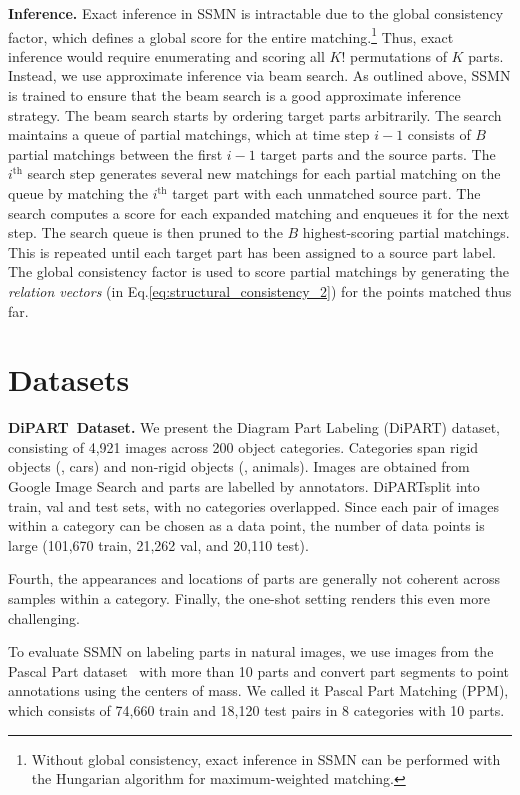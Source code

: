 \documentclass[10pt,twocolumn,letterpaper]{article}
\newcommand{\dataset}{\mbox{DiPART}}
\begin{document}
\vspace{.5em}\noindent\textbf{Inference.}
Exact inference in SSMN is intractable due to the global consistency factor, which defines a global score for the entire matching.\footnote{Without global consistency, exact inference in SSMN can be performed with the Hungarian algorithm for maximum-weighted matching.} Thus, exact inference would require enumerating and scoring all $K!$ permutations of $K$ parts. Instead, we use approximate inference via beam search. As outlined above, SSMN is trained to ensure that the beam search is a good approximate inference strategy. The beam search starts by ordering target parts arbitrarily. The search maintains a queue of partial matchings, which at time step $i - 1$ consists of $B$ partial matchings between the first $i-1$ target parts and the source parts. The $i^\text{th}$ search step generates several new matchings for each partial matching on the queue by matching the $i^\text{th}$ target part with each unmatched source part. The search computes a score for each expanded matching and enqueues it for the next step. The search queue is then pruned to the $B$ highest-scoring partial matchings. This is repeated until each target part has been assigned to a source part label. The global consistency factor is used to score partial matchings by generating the \emph{relation vectors} (in Eq.\ref{eq:structural_consistency_2}) for the points matched thus far.


\section{Datasets}
\label{sec:dataset}
\noindent\textbf{\dataset\ Dataset.}
We present the Diagram Part Labeling (\dataset) dataset, consisting of 4,921 images across 200 object categories. Categories span rigid objects (\eg, cars) and non-rigid objects (\eg, animals). Images are obtained from Google Image Search and parts are labelled by annotators. \dataset\is split into train, val and test sets, with no categories overlapped. Since each pair of images within a category can be chosen as a data point, the number of data points is large (101,670 train, 21,262 val, and 20,110 test).

Fourth, the appearances and locations of parts are generally not coherent across samples within a category. Finally, the one-shot setting renders this even more challenging.

To evaluate SSMN on labeling parts in natural images, we use images from the Pascal Part dataset~\cite{chenMLFUY14} with more than 10 parts and convert part segments to point annotations using the centers of mass. We called it Pascal Part Matching (PPM), which consists of 74,660 train and 18,120 test pairs in 8 categories with 10 parts.
\end{document}
